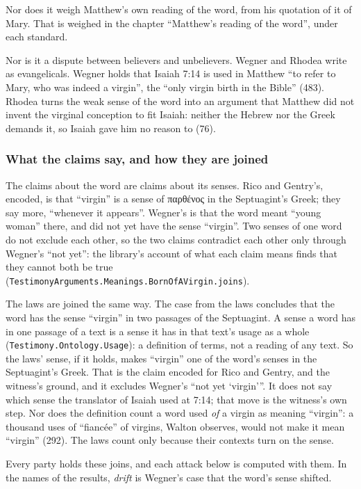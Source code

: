 \documentclass[11pt]{article}
\begin{document}
Nor does it weigh Matthew’s own reading of the word, from his quotation of it of Mary. That is weighed in the chapter “Matthew’s reading of the word”, under each standard.

Nor is it a dispute between believers and unbelievers. Wegner and Rhodea write as evangelicals. Wegner holds that Isaiah 7:14 is used in Matthew “to refer to Mary, who was indeed a virgin”, the “only virgin birth in the Bible” (483). Rhodea turns the weak sense of the word into an argument that Matthew did not invent the virginal conception to fit Isaiah: neither the Hebrew nor the Greek demands it, so Isaiah gave him no reason to (76).

\subsubsection*{What the claims say, and how they are joined}
The claims about the word are claims about its senses. Rico and Gentry’s, encoded, is that “virgin” is a sense of παρθένος in the Septuagint’s Greek; they say more, “whenever it appears”. Wegner’s is that the word meant “young woman” there, and did not yet have the sense “virgin”. Two senses of one word do not exclude each other, so the two claims contradict each other only through Wegner’s “not yet”: the library’s account of what each claim means finds that they cannot both be true (\texttt{Testimony\allowbreak{}Arguments.Meanings.Born\allowbreak{}Of\allowbreak{}AVirgin.joins}).

The laws are joined the same way. The case from the laws concludes that the word has the sense “virgin” in two passages of the Septuagint. A sense a word has in one passage of a text is a sense it has in that text’s usage as a whole (\texttt{Testimony.Ontology.Usage}): a definition of terms, not a reading of any text. So the laws’ sense, if it holds, makes “virgin” one of the word’s senses in the Septuagint’s Greek. That is the claim encoded for Rico and Gentry, and the witness’s ground, and it excludes Wegner’s “not yet ‘virgin’”. It does not say which sense the translator of Isaiah used at 7:14; that move is the witness’s own step. Nor does the definition count a word used \emph{of} a virgin as meaning “virgin”: a thousand uses of “fiancée” of virgins, Walton observes, would not make it mean “virgin” (292). The laws count only because their contexts turn on the sense.

Every party holds these joins, and each attack below is computed with them. In the names of the results, \emph{drift} is Wegner’s case that the word’s sense shifted.
\end{document}
